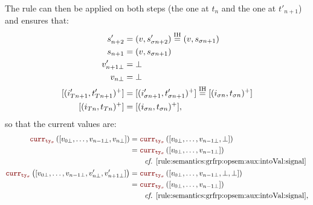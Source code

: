 \begin{skippableproof}
\begin{itemize}
              The rule  can then be applied
              on both steps (the one at $t_n$ and the one at $t'_{n+1}$) and ensures that:
              \begin{align*}
                  s'_{n+2}                   & = (v, s'_{\sigma n+2}) \overset{\mathrm{IH}}{=} (v, s_{\sigma n+1})                                \\
                  s_{n+1}                    & = (v, s_{\sigma n+1})                                                               \\
                  v'_{n+1\bot}               & = \bot                                                                              \\
                  v_{n\bot}                  & = \bot                                                                              \\
                  [(i'_{Tn+1}, t'_{Tn+1})^+] & = [(i'_{\sigma n+1}, t'_{\sigma n+1})^+] \overset{\mathrm{IH}}{=} [(i_{\sigma n}, t_{\sigma n})^+] \\
                  [(i_{Tn}, t_{Tn})^+]       & = [(i_{\sigma n}, t_{\sigma n})^+],
              \end{align*}
              so that the current values are:
              \begin{align*}
                  \CurrVal{ty_\sigma}{[v_{0\bot}, \dots, v_{n-1\bot}, v_{n\bot}]}                & = \CurrVal{ty_\sigma}{[v_{0\bot}, \dots, v_{n-1\bot}, \bot]}            \\
                                                                                                 & = \CurrVal{ty_\sigma}{[v_{0\bot}, \dots, v_{n-1\bot}]}                  \\
                                                                                                 & \qquad \text{\cf \Cref{rule:semantics:grfrp:opsem:aux:intoVal:signal}}  \\
                  \CurrVal{ty_\sigma}{[v_{0\bot}, \dots, v_{n-1\bot}, v'_{n\bot}, v'_{n+1\bot}]} & = \CurrVal{ty_\sigma}{[v_{0\bot}, \dots, v_{n-1\bot}, \bot, \bot]}      \\
                                                                                                 & = \CurrVal{ty_\sigma}{[v_{0\bot}, \dots, v_{n-1\bot}]}                  \\
                                                                                                 & \qquad \text{\cf \Cref{rule:semantics:grfrp:opsem:aux:intoVal:signal}},

\end{align*}
\end{itemize}
\end{skippableproof}
